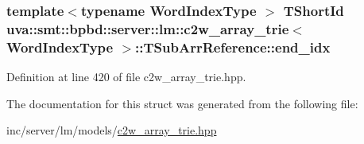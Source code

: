\subsubsection[{end\+\_\+idx}]{\setlength{\rightskip}{0pt plus 5cm}template$<$typename Word\+Index\+Type $>$ {\bf T\+Short\+Id} {\bf uva\+::smt\+::bpbd\+::server\+::lm\+::c2w\+\_\+array\+\_\+trie}$<$ {\bf Word\+Index\+Type} $>$\+::T\+Sub\+Arr\+Reference\+::end\+\_\+idx}\label{structuva_1_1smt_1_1bpbd_1_1server_1_1lm_1_1c2w__array__trie_1_1_t_sub_arr_reference_ab6f97bbea4b4fef4ba31b69127037f03}


Definition at line 420 of file c2w\+\_\+array\+\_\+trie.\+hpp.



The documentation for this struct was generated from the following file\+:\begin{DoxyCompactItemize}
\item 
inc/server/lm/models/\hyperlink{c2w__array__trie_8hpp}{c2w\+\_\+array\+\_\+trie.\+hpp}\end{DoxyCompactItemize}
